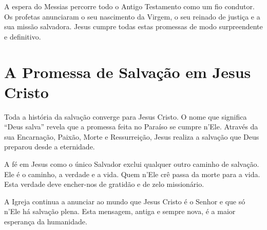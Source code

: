 A espera do Messias percorre todo o Antigo Testamento como um fio condutor. Os profetas anunciaram o seu nascimento da Virgem, o seu reinado de justiça e a sua missão salvadora. Jesus cumpre todas estas promessas de modo surpreendente e definitivo.

\section{A Promessa de Salvação em Jesus Cristo}

Toda a história da salvação converge para Jesus Cristo. O nome que significa ``Deus salva'' revela que a promessa feita no Paraíso se cumpre n’Ele. Através da sua Encarnação, Paixão, Morte e Ressurreição, Jesus realiza a salvação que Deus preparou desde a eternidade.

A fé em Jesus como o único Salvador exclui qualquer outro caminho de salvação. Ele é o caminho, a verdade e a vida. Quem n’Ele crê passa da morte para a vida. Esta verdade deve encher-nos de gratidão e de zelo missionário.

A Igreja continua a anunciar ao mundo que Jesus Cristo é o Senhor e que só n’Ele há salvação plena. Esta mensagem, antiga e sempre nova, é a maior esperança da humanidade.
